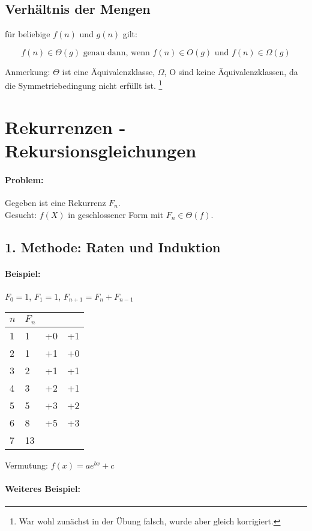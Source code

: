 \documentclass[a4paper]{scrartcl}
\begin{document}
\subsection{Verhältnis der Mengen}

für beliebige $f(n)$ und $g(n)$ gilt:

$$ f(n)\in\Theta(g) \text{ genau dann, wenn } f(n)\in O(g) \text{ und } f(n)\in\Omega(g) $$

Anmerkung: $\Theta$ ist eine Äquivalenzklasse, $\Omega$, O sind keine Äquivalenzklassen, da die Symmetriebedingung nicht erfüllt ist. \footnote{War wohl zunächst in der Übung falsch, wurde aber gleich korrigiert.}

\section{Rekurrenzen - Rekursionsgleichungen}

\paragraph{Problem:} Gegeben ist eine Rekurrenz $F_n$. \\ Gesucht: $f(X)$ in geschlossener Form mit $F_n\in \Theta(f)$.

\subsection{1. Methode: \glqq Raten und Induktion\grqq}

\paragraph{Beispiel:}

$F_0  = 1$, $F_1 = 1$, $F_{n+1}  = F_n + F_{n-1}$

\begin{tabular}{llll}
$n$ & $F_n$ \\
\hline
1 & 1 & +0  & +1 \\
2 & 1 & +1 & +0\\
3 & 2 & +1 & +1\\
4 & 3 &+2 & +1 \\
5 & 5 & +3 & +2\\
6 & 8 &+5 &+3 \\
7 & 13  
\end{tabular}

Vermutung: $f(x) = ae^{bx}+c$

\paragraph{Weiteres Beispiel:}\hspace{0.1mm}
\end{document}
